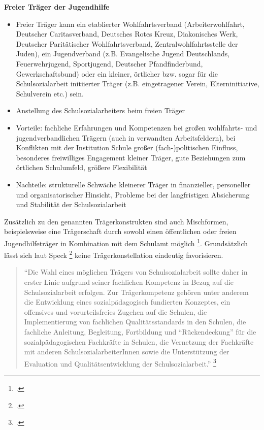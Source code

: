 \noindent
\textbf{Freier Träger der Jugendhilfe}\\
\begin{itemize}
	\item Freier Träger kann ein etablierter Wohlfahrtsverband (Arbeiterwohlfahrt, Deutscher Caritasverband, Deutsches Rotes Kreuz, Diakonisches Werk, Deutscher Paritätischer Wohlfahrtsverband, Zentralwohlfahrtsstelle der Juden), ein Jugendverband (z.B. Evangelische Jugend Deutschlands, Feuerwehrjugend, Sportjugend, Deutscher Pfandfinderbund, Gewerkschaftsbund) oder ein kleiner, örtlicher bzw. sogar für die Schulsozialarbeit initiierter Träger (z.B. eingetragener Verein, Elterninitiative, Schulverein etc.) sein.
	\item Anstellung des Schulsozialarbeiters beim freien Träger
	\item Vorteile: fachliche Erfahrungen und Kompetenzen bei großen wohlfahrts- und jugendverbandlichen Trägern (auch in verwandten Arbeitsfeldern), bei Konflikten mit der Institution Schule großer (fach-)politischen Einfluss, besonderes freiwilliges Engagement kleiner Träger, gute Beziehungen zum örtlichen Schulumfeld, größere Flexibilität
	\item Nachteile: strukturelle Schwäche kleinerer Träger in finanzieller, personeller und organisatorischer Hinsicht, Probleme bei der langfristigen Absicherung und Stabilität der Schulsozialarbeit 
\end{itemize}

\noindent
Zusätzlich zu den genannten Trägerkonstrukten sind auch Mischformen, beispielsweise eine Trägerschaft durch sowohl einen öffentlichen oder freien Jugendhilfeträger in Kombination mit dem Schulamt möglich \footcite[vgl.][63]{Spies2011}. Grundsätzlich lässt sich laut Speck \footcite{BIVSD2013} keine Trägerkonstellation eindeutig favorisieren.

\begin{quotation}
\noindent
"`Die Wahl eines möglichen Trägers von Schulsozialarbeit sollte daher in erster Linie aufgrund seiner fachlichen Kompetenz in Bezug auf die Schulsozialarbeit erfolgen. Zur Trägerkompetenz gehören unter anderem die Entwicklung eines sozialpädagogisch fundierten Konzeptes, ein offensives und vorurteilsfreies Zugehen auf die Schulen, die Implementierung von fachlichen Qualitätsstandards in den Schulen, die fachliche Anleitung, Begleitung, Fortbildung und "`Rückendeckung"' für die sozialpädagogischen Fachkräfte in Schulen, die Vernetzung der Fachkräfte mit anderen SchulsozialarbeiterInnen sowie die Unterstützung der Evaluation und Qualitätsentwicklung der Schulsozialarbeit."' \footcite{BIVSD2013}
\end{quotation}

